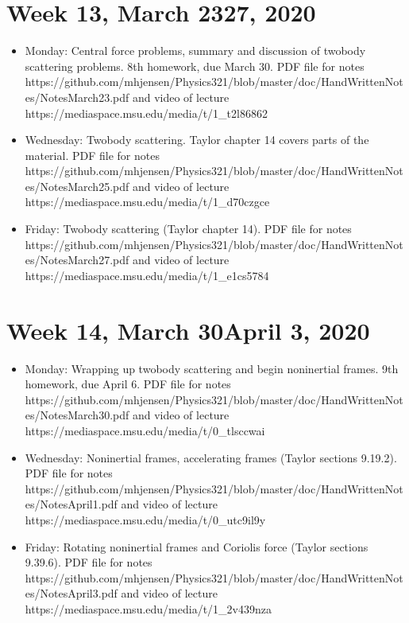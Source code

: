 \documentclass[letterpaper,10pt,english]{sphinxmanual}
\begin{document}
\section{Week 13, March 23\sphinxhyphen{}27, 2020}
\label{\detokenize{intro:week-13-march-23-27-2020}}\begin{itemize}
\item {} 
Monday: Central force problems, summary and discussion of two\sphinxhyphen{}body scattering problems. 8th homework, due March 30. PDF file for notes https://github.com/mhjensen/Physics321/blob/master/doc/HandWrittenNotes/NotesMarch23.pdf and video of lecture https://mediaspace.msu.edu/media/t/1\_t2l86862

\item {} 
Wednesday: Two\sphinxhyphen{}body scattering. Taylor chapter 14 covers parts of the material. PDF file for notes https://github.com/mhjensen/Physics321/blob/master/doc/HandWrittenNotes/NotesMarch25.pdf and video of lecture https://mediaspace.msu.edu/media/t/1\_d70czgce

\item {} 
Friday:  Two\sphinxhyphen{}body scattering (Taylor chapter 14). PDF file for notes https://github.com/mhjensen/Physics321/blob/master/doc/HandWrittenNotes/NotesMarch27.pdf and video of lecture https://mediaspace.msu.edu/media/t/1\_e1cs5784

\end{itemize}


\section{Week 14, March 30\sphinxhyphen{}April 3, 2020}
\label{\detokenize{intro:week-14-march-30-april-3-2020}}\begin{itemize}
\item {} 
Monday: Wrapping up two\sphinxhyphen{}body scattering and begin non\sphinxhyphen{}inertial frames.  9th homework, due April 6. PDF file for notes https://github.com/mhjensen/Physics321/blob/master/doc/HandWrittenNotes/NotesMarch30.pdf and video of lecture https://mediaspace.msu.edu/media/t/0\_tlsccwai

\item {} 
Wednesday: Non\sphinxhyphen{}inertial frames, accelerating frames (Taylor sections 9.1\sphinxhyphen{}9.2).  PDF file for notes https://github.com/mhjensen/Physics321/blob/master/doc/HandWrittenNotes/NotesApril1.pdf and video of lecture https://mediaspace.msu.edu/media/t/0\_utc9il9y

\item {} 
Friday: Rotating non\sphinxhyphen{}inertial frames and Coriolis force (Taylor sections 9.3\sphinxhyphen{}9.6). PDF file for notes https://github.com/mhjensen/Physics321/blob/master/doc/HandWrittenNotes/NotesApril3.pdf and video of lecture https://mediaspace.msu.edu/media/t/1\_2v439nza

\end{itemize}
\end{document}
